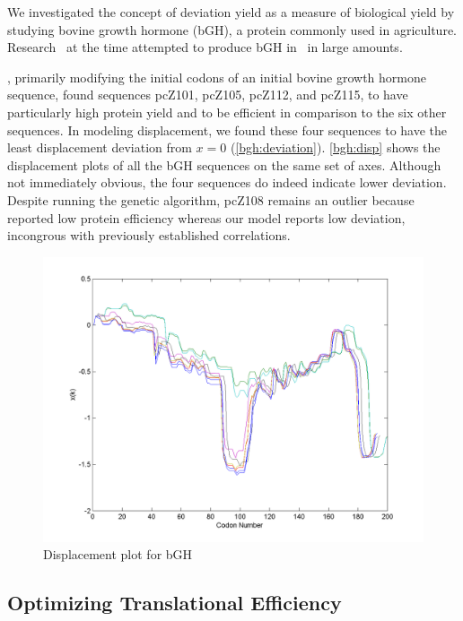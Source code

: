 \documentclass[12pt, draft]{article}
\numberwithin{equation}{section}
\begin{document}
We investigated the concept of deviation yield as a measure of biological
yield by studying bovine growth hormone (bGH), a protein commonly used
in agriculture.
Research~\cite{schoner:bgh} at the time attempted to produce bGH
in \ecoli\ in large amounts.



\citet{schoner:bgh}, primarily modifying the initial codons of an
initial bovine growth hormone sequence, found sequences pcZ101,
pcZ105, pcZ112, and pcZ115, to have particularly high protein yield
and to be efficient in comparison to the six other sequences. In
modeling displacement, we found these four sequences  to have the least
displacement deviation from $x = 0$
(\autoref{bgh:deviation}). \autoref{bgh:disp} shows the displacement
plots of all the bGH sequences on the same set of axes. Although not
immediately obvious, the four sequences do indeed indicate lower
deviation. Despite running the genetic algorithm, pcZ108 remains an
outlier because \citeauthor{schoner:bgh} reported low protein
efficiency whereas our model reports low deviation, incongrous with
previously established correlations.

\begin{figure}
  \centering
  \caption{Displacement plot for bGH}
  \label{bgh:disp}
  \includegraphics[scale=0.4]{bgh/all}
\end{figure}

\subsection{Optimizing Translational Efficiency}
\end{document}
